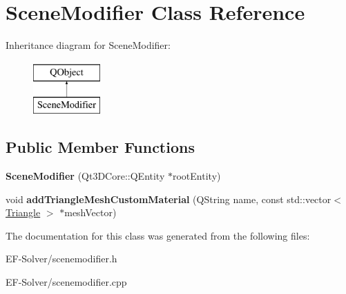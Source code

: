 \hypertarget{class_scene_modifier}{}\section{Scene\+Modifier Class Reference}
\label{class_scene_modifier}
Inheritance diagram for Scene\+Modifier\+:\begin{figure}[H]
\begin{center}
\leavevmode
\includegraphics[height=2.000000cm]{class_scene_modifier}
\end{center}
\end{figure}
\subsection*{Public Member Functions}
\begin{DoxyCompactItemize}
\item 
{\bfseries Scene\+Modifier} (Qt3\+D\+Core\+::\+Q\+Entity $\ast$root\+Entity)\hypertarget{class_scene_modifier_acc07d34e62c8ff22c535f2b7f6478505}{}\label{class_scene_modifier_acc07d34e62c8ff22c535f2b7f6478505}

\item 
void {\bfseries add\+Triangle\+Mesh\+Custom\+Material} (Q\+String name, const std\+::vector$<$ \hyperlink{struct_triangle}{Triangle} $>$ $\ast$mesh\+Vector)\hypertarget{class_scene_modifier_a8fb7efb9da9f0cbd101c20ab3dc5f1a7}{}\label{class_scene_modifier_a8fb7efb9da9f0cbd101c20ab3dc5f1a7}

\end{DoxyCompactItemize}


The documentation for this class was generated from the following files\+:\begin{DoxyCompactItemize}
\item 
E\+F-\/\+Solver/scenemodifier.\+h\item 
E\+F-\/\+Solver/scenemodifier.\+cpp\end{DoxyCompactItemize}
